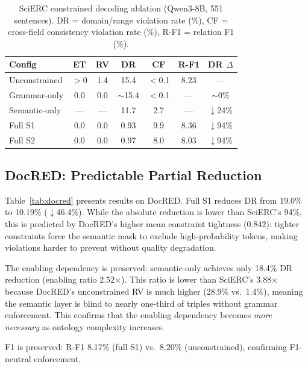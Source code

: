 \documentclass[11pt,a4paper]{article}
\begin{document}
\begin{table}[t]
\centering
\small
\caption{SciERC constrained decoding ablation (Qwen3-8B, 551 sentences). DR = domain/range violation rate (\%), CF = cross-field consistency violation rate (\%), R-F1 = relation F1 (\%).}
\label{tab:scierc}
\begin{tabular}{lcccccc}
\toprule
\textbf{Config} & \textbf{ET} & \textbf{RV} & \textbf{DR} & \textbf{CF} & \textbf{R-F1} & \textbf{DR $\Delta$} \\
\midrule
Unconstrained   & $>$0 & 1.4 & 15.4 & $<$0.1 & 8.23 & --- \\
Grammar-only    & 0.0  & 0.0 & $\sim$15.4 & $<$0.1 & --- & $\sim$0\% \\
Semantic-only   & ---  & --- & 11.7 & 2.7  & --- & $\downarrow$24\% \\
Full S1         & 0.0  & 0.0 & 0.93 & 9.9  & 8.36 & $\downarrow$94\% \\
Full S2         & 0.0  & 0.0 & 0.97 & 8.0  & 8.03 & $\downarrow$94\% \\
\bottomrule
\end{tabular}
\end{table}

\subsection{DocRED: Predictable Partial Reduction}

Table~\ref{tab:docred} presents results on DocRED.
Full S1 reduces DR from 19.0\% to 10.19\% ($\downarrow$46.4\%).
While the absolute reduction is lower than SciERC's 94\%, this is predicted by DocRED's higher mean constraint tightness (0.842): tighter constraints force the semantic mask to exclude high-probability tokens, making violations harder to prevent without quality degradation.

The enabling dependency is preserved: semantic-only achieves only 18.4\% DR reduction (enabling ratio 2.52$\times$).
This ratio is lower than SciERC's 3.88$\times$ because DocRED's unconstrained RV is much higher (28.9\% vs.\ 1.4\%), meaning the semantic layer is blind to nearly one-third of triples without grammar enforcement.
This confirms that the enabling dependency becomes \emph{more necessary} as ontology complexity increases.

F1 is preserved: R-F1 8.17\% (full S1) vs.\ 8.20\% (unconstrained), confirming F1-neutral enforcement.
\end{document}
